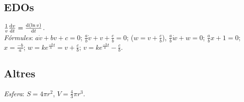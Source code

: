 \subsection{EDOs}
\ci $\frac{1}{v}\frac{\dif v}{\dif t} = \frac{\dif\, (\ln v)}{\dif t}$. \\
\emph{Fórmules}: $a\dot{v}+bv+c=0$; $\frac{a}{b}\dot{v}+v+\frac{c}{b}=0$; ($w=v+\frac{c}{b}$), $\frac{a}{b}\dot{w}+w=0$; $\frac{a}{b}x+1=0$; $x=\frac{-b}{a}$; $w=k e^{\frac{-b}{a}t}=v+\frac{c}{b}$; $v=ke^{\frac{-b}{a}t}-\frac{c}{b}$.

\subsection{Altres}
\emph{Esfera}: $S=4\pi r^2$, $V=\frac{4}{3}\pi r^3$.
